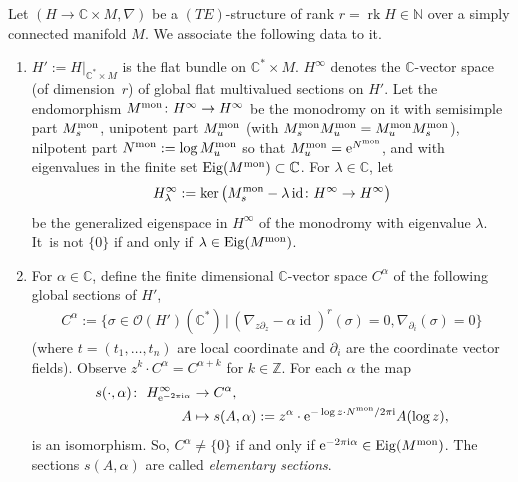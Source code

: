 \documentclass[pdftex]{sigma}%
\numberwithin{equation}{section}
\numberwithin{figure}{section}
\newcommand{\N}{{\mathbb N}}
\newcommand{\Z}{{\mathbb Z}}
\newcommand{\C}{{\mathbb C}}
\newcommand{\OO}{{\mathcal O}}
\newcommand{\paa}{\partial}
\newcommand{\nnn}{\nabla}
\DeclareMathOperator{\Eig}{Eig}
\DeclareMathOperator{\id}{id}
\DeclareMathOperator{\rk}{rk}
\begin{document}
\begin{Definition}\label{t3.21}
Let $(H\to \C\times M,\nnn)$ be a $(TE)$-structure
of rank $r=\rk H\in\N$ over a simply connected manifold $M$.
We associate the following data to it.
\begin{enumerate}\itemsep=0pt
\item[$(a)$] $H':=H|_{\C^*\times M}$ is the flat bundle on
$\C^*\times M$.
$H^\infty$ denotes the $\C$-vector space (of dimen\-sion~$r$)
of global flat multivalued sections on $H'$.
Let the endomorphism $M^{\rm mon}\colon H^\infty\to H^\infty$
be the monodromy on it with semisimple part
$M^{\rm mon}_s$, unipotent part $M^{\rm mon}_u$
(with $M^{\rm mon}_sM^{\rm mon}_u=M^{\rm mon}_uM^{\rm mon}_s$),
nilpotent part $N^{\rm mon}:=\log M^{\rm mon}_u$
so that $M^{\rm mon}_u={\rm e}^{N^{\rm mon}}$,
and with eigenvalues in the finite set
$\Eig(M^{\rm mon})\subset\C$. For $\lambda\in\C$, let
\begin{gather*}
H^\infty_\lambda:=\ker\big(M^{\rm mon}_s-\lambda\id\colon H^\infty\to
H^\infty\big)
\end{gather*}
be the generalized eigenspace in $H^\infty$
of the monodromy with eigenvalue $\lambda$. It~is not $\{0\}$ if and only if $\lambda\in\Eig(M^{\rm mon})$.

\item[$(b)$] For $\alpha\in\C$, define the finite dimensional
$\C$-vector space $C^\alpha$
of the following global sections of $H'$,
\begin{gather*}%
C^\alpha:= \big\{\sigma\in\OO(H')(\C^*)\,|\, (\nnn_{z\paa_z}-\alpha\id)^r(\sigma)=0,
\nnn_{\paa_i}(\sigma)=0\big\}
\end{gather*}
(where $t=(t_1,\dots ,t_n)$ are local coordinate and
$\paa_i$ are the coordinate vector fields).
Observe $z^k\cdot C^\alpha =C^{\alpha+k}$ for $k\in\Z$.
For each $\alpha$ the map
\begin{align*}
s(\cdot,\alpha)\colon\ H^\infty_{{\rm e}^{-2\pi {\rm i}\alpha}}&\to C^\alpha,
\\
A&\mapsto s(A,\alpha):=z^\alpha\cdot
{\rm e}^{-\log z\cdot N^{\rm mon}/2\pi {\rm i}}A(\log z),
\end{align*}
is an isomorphism. So, $C^\alpha\neq\{0\}$ if and only if
${\rm e}^{-2\pi {\rm i}\alpha}\in\Eig(M^{\rm mon})$.
The sections $s(A,\alpha)$ are called
{\it elementary sections}.


\end{enumerate}
\end{Definition}
\end{document}
